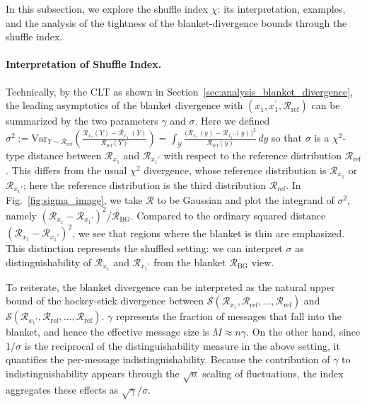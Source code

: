 \documentclass{article}
\theoremstyle{plain}
\theoremstyle{definition}
\begin{document}
In this subsection, we explore the shuffle index $\chi$: its interpretation, examples, and the analysis of the tightness of the blanket-divergence bounds through the shuffle index.



\paragraph{Interpretation of Shuffle Index.}

Technically, by the CLT as shown in Section~\ref{sec:analysis_blanket_divergence}, the leading asymptotics of the blanket divergence with $(x_1,x_1^\prime,\mathcal R_{\mathrm{ref}})$ can be summarized by the two parameters $\gamma$ and $\sigma$. 
Here we defined
$
\sigma^2
:=
\mathrm{Var}_{Y\sim\mathcal R_{\mathrm{ref}}}\left(\frac{\mathcal R_{x_1}(Y)-\mathcal R_{x_1'}(Y)}{\mathcal R_{\mathrm{ref}}(Y)}\right)
=
\int_{\mathcal Y}
\frac{\bigl(\mathcal R_{x_1}(y)-\mathcal R_{x_1'}(y)\bigr)^2}{\mathcal R_{\mathrm{ref}}(y)}\,dy
$
so that $\sigma$ is a $\chi^2$-type distance between $\mathcal R_{x_1}$ and $\mathcal R_{x_1'}$ with respect to the reference distribution $\mathcal R_{\mathrm{ref}}$.
This differs from the usual $\chi^2$ divergence, whose reference distribution is $\mathcal R_{x_1}$ or $\mathcal R_{x_1'}$; here the reference distribution is the third distribution $\mathcal R_{\mathrm{ref}}$.
In Fig.~\ref{fig:sigma_image}, we take $\mathcal R$ to be Gaussian and plot the integrand of $\sigma^2$, namely $(\mathcal R_{x_1}-\mathcal R_{x_1'})^2/\mathcal R_{\mathrm{BG}}$.
Compared to the ordinary squared distance $(\mathcal R_{x_1}-\mathcal R_{x_1'})^2$, we see that regions where the blanket is thin are emphasized.
This distinction represents the shuffled setting: we can interpret $\sigma$ as distinguishability of $\mathcal{R}_{x_1}$ and $\mathcal{R}_{x_1'}$ from the blanket $\mathcal R_{\mathrm{BG}}$ view.


To reiterate, the blanket divergence can be interpreted as the natural upper bound of the hockey-stick divergence between $\mathcal S(\mathcal R_{x_1},\mathcal R_{\mathrm{ref}},\ldots,\mathcal R_{\mathrm{ref}})$ and $\mathcal S(\mathcal R_{x_1'},\mathcal R_{\mathrm{ref}},\ldots,\mathcal R_{\mathrm{ref}})$.
$\gamma$ represents the fraction of messages that fall into the blanket, and hence the effective message size is $M\approx n\gamma$.
On the other hand, since $1/\sigma$ is the reciprocal of the distinguishability measure in the above setting, it quantifies the per-message indistinguishability.
Because the contribution of $\gamma$ to indistinguishability appears through the $\sqrt{n}$ scaling of fluctuations, the index aggregates these effects as $\sqrt{\gamma}/\sigma$.
\end{document}
